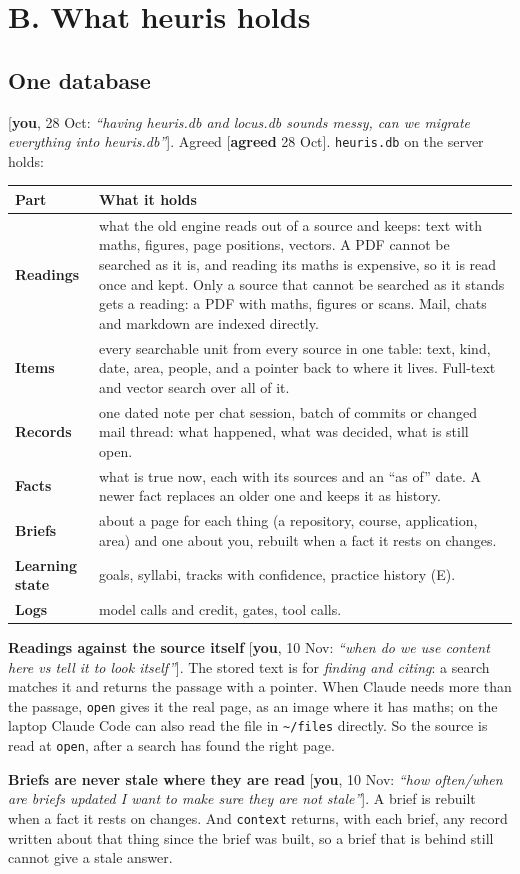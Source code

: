 \documentclass[10pt]{extarticle}
\newcommand{\you}[2]{{\small[\textbf{you}, #1: \textit{``#2''}]}}
\newcommand{\agreed}[1]{{\small[\textbf{agreed} #1]}}
\newcommand{\Sec}[1]{\section*{#1}\addcontentsline{toc}{section}{#1}}
\newcommand{\Sub}[1]{\subsection*{#1}}
\begin{document}
\Sec{B. What heuris holds}

\Sub{One database}
\you{28 Oct}{having heuris.db and locus.db sounds messy, can we migrate everything into heuris.db}. Agreed \agreed{28 Oct}. \texttt{heuris.db} on the server holds:

\begin{tabularx}{\linewidth}{@{}l Y@{}}
\toprule
Part & What it holds \\
\midrule
\textbf{Readings} & what the old engine reads out of a source and keeps: text with maths, figures, page positions, vectors. A PDF cannot be searched as it is, and reading its maths is expensive, so it is read once and kept. Only a source that cannot be searched as it stands gets a reading: a PDF with maths, figures or scans. Mail, chats and markdown are indexed directly. \\
\textbf{Items} & every searchable unit from every source in one table: text, kind, date, area, people, and a pointer back to where it lives. Full-text and vector search over all of it. \\
\textbf{Records} & one dated note per chat session, batch of commits or changed mail thread: what happened, what was decided, what is still open. \\
\textbf{Facts} & what is true now, each with its sources and an ``as of'' date. A newer fact replaces an older one and keeps it as history. \\
\textbf{Briefs} & about a page for each thing (a repository, course, application, area) and one about you, rebuilt when a fact it rests on changes. \\
\textbf{Learning state} & goals, syllabi, tracks with confidence, practice history (E). \\
\textbf{Logs} & model calls and credit, gates, tool calls. \\
\bottomrule
\end{tabularx}

\medskip
\textbf{Readings against the source itself} \you{10 Nov}{when do we use content here vs tell it to look itself}. The stored text is for \emph{finding and citing}: a search matches it and returns the passage with a pointer. When Claude needs more than the passage, \texttt{open} gives it the real page, as an image where it has maths; on the laptop Claude Code can also read the file in \texttt{\textasciitilde/files} directly. So the source is read at \texttt{open}, after a search has found the right page.

\textbf{Briefs are never stale where they are read} \you{10 Nov}{how often/when are briefs updated I want to make sure they are not stale}. A brief is rebuilt when a fact it rests on changes. And \texttt{context} returns, with each brief, any record written about that thing since the brief was built, so a brief that is behind still cannot give a stale answer.
\end{document}
